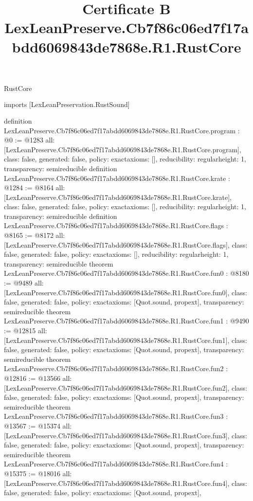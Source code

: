 \begin{lexlean}{RustCore}
\title{Certificate B LexLeanPreserve.Cb7f86c06ed7f17abdd6069843de7868e.R1.RustCore}
\begin{coremodule}
imports [LexLeanPreservation.RustSound]

definition LexLeanPreserve.Cb7f86c06ed7f17abdd6069843de7868e.R1.RustCore.program : @0 := @1283 {
  all: [LexLeanPreserve.Cb7f86c06ed7f17abdd6069843de7868e.R1.RustCore.program],
  class: false,
  generated: false,
  policy: exact{axioms: []},
  reducibility: regular{height: 1},
  transparency: semireducible
}
definition LexLeanPreserve.Cb7f86c06ed7f17abdd6069843de7868e.R1.RustCore.krate : @1284 := @8164 {
  all: [LexLeanPreserve.Cb7f86c06ed7f17abdd6069843de7868e.R1.RustCore.krate],
  class: false,
  generated: false,
  policy: exact{axioms: []},
  reducibility: regular{height: 1},
  transparency: semireducible
}
definition LexLeanPreserve.Cb7f86c06ed7f17abdd6069843de7868e.R1.RustCore.flags : @8165 := @8172 {
  all: [LexLeanPreserve.Cb7f86c06ed7f17abdd6069843de7868e.R1.RustCore.flags],
  class: false,
  generated: false,
  policy: exact{axioms: []},
  reducibility: regular{height: 1},
  transparency: semireducible
}
theorem LexLeanPreserve.Cb7f86c06ed7f17abdd6069843de7868e.R1.RustCore.fun0 : @8180 := @9489 {
  all: [LexLeanPreserve.Cb7f86c06ed7f17abdd6069843de7868e.R1.RustCore.fun0],
  class: false,
  generated: false,
  policy: exact{axioms: [Quot.sound, propext]},
  transparency: semireducible
}
theorem LexLeanPreserve.Cb7f86c06ed7f17abdd6069843de7868e.R1.RustCore.fun1 : @9490 := @12815 {
  all: [LexLeanPreserve.Cb7f86c06ed7f17abdd6069843de7868e.R1.RustCore.fun1],
  class: false,
  generated: false,
  policy: exact{axioms: [Quot.sound, propext]},
  transparency: semireducible
}
theorem LexLeanPreserve.Cb7f86c06ed7f17abdd6069843de7868e.R1.RustCore.fun2 : @12816 := @13566 {
  all: [LexLeanPreserve.Cb7f86c06ed7f17abdd6069843de7868e.R1.RustCore.fun2],
  class: false,
  generated: false,
  policy: exact{axioms: [Quot.sound, propext]},
  transparency: semireducible
}
theorem LexLeanPreserve.Cb7f86c06ed7f17abdd6069843de7868e.R1.RustCore.fun3 : @13567 := @15374 {
  all: [LexLeanPreserve.Cb7f86c06ed7f17abdd6069843de7868e.R1.RustCore.fun3],
  class: false,
  generated: false,
  policy: exact{axioms: [Quot.sound, propext]},
  transparency: semireducible
}
theorem LexLeanPreserve.Cb7f86c06ed7f17abdd6069843de7868e.R1.RustCore.fun4 : @15375 := @18016 {
  all: [LexLeanPreserve.Cb7f86c06ed7f17abdd6069843de7868e.R1.RustCore.fun4],
  class: false,
  generated: false,
  policy: exact{axioms: [Quot.sound, propext]},
}
\end{coremodule}
\end{lexlean}
